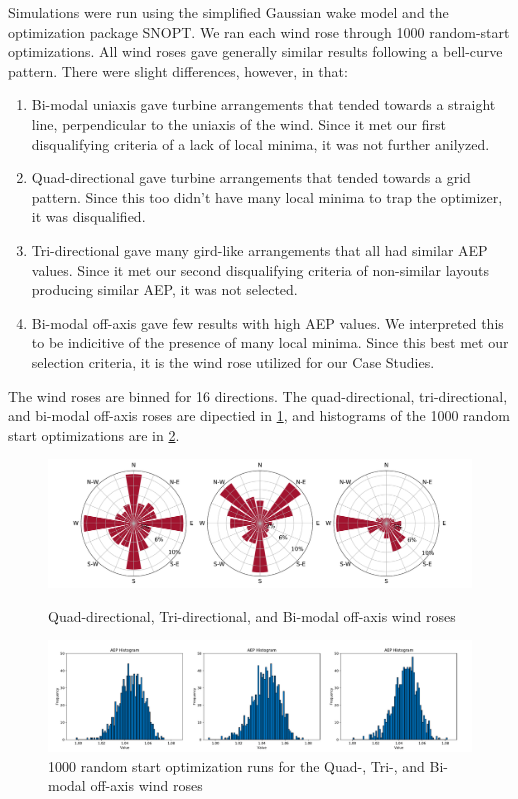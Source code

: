 	Simulations were run using the simplified Gaussian wake model and the optimization package SNOPT.
	We ran each wind rose through 1000 random-start optimizations.
	All wind roses gave generally similar results following a bell-curve pattern.
	There were slight differences, however, in that:

	\begin{enumerate}
		\item Bi-modal uniaxis gave turbine arrangements that tended towards a straight line, perpendicular to the uniaxis of the wind. Since it met our first disqualifying criteria of a lack of local minima, it was not further anilyzed.
		\item Quad-directional gave turbine arrangements that tended towards a grid pattern. Since this too didn't have many local minima to trap the optimizer, it was disqualified.
		\item Tri-directional gave many gird-like arrangements that all had similar AEP values. Since it met our second disqualifying criteria of non-similar layouts producing similar AEP, it was not selected.
		\item Bi-modal off-axis gave few results with high AEP values. We interpreted this to be indicitive of the presence of many local minima. Since this best met our selection criteria, it is the wind rose utilized for our Case Studies.
	\end{enumerate}
	
	The wind roses are binned for 16 directions. The quad-directional, tri-directional, and bi-modal off-axis roses are dipectied in \cref{fig:testroses}, and histograms of the 1000 random start optimizations are in \cref{fig:rosehists}.

	\begin{figure}[H]
		\centering
			\caption{Quad-directional, Tri-directional, and Bi-modal off-axis wind roses}
			\includegraphics[width=\textwidth]{./figures/testroses.pdf}
		\label{fig:testroses}
	\end{figure}

	\begin{figure}[H]
		\centering
			\includegraphics[width=\textwidth]{./figures/rosehists.pdf}
		\caption{1000 random start optimization runs for the Quad-, Tri-, and Bi-modal off-axis wind roses}
		\label{fig:rosehists}
	\end{figure}

